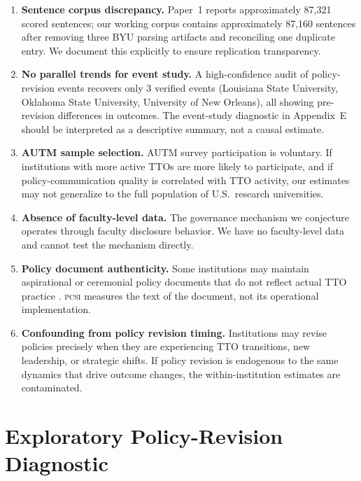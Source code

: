 \documentclass[12pt]{article}
\newcommand{\PCSI}{\textsc{pcsi}}
\begin{document}
\begin{enumerate}
\item \textbf{Sentence corpus discrepancy.} Paper~1 reports approximately 87,321
scored sentences; our working corpus contains approximately 87,160 sentences after
removing three BYU parsing artifacts and reconciling one duplicate entry. We
document this explicitly to ensure replication transparency.

\item \textbf{No parallel trends for event study.} A high-confidence audit of
policy-revision events recovers only 3 verified events (Louisiana State University,
Oklahoma State University, University of New Orleans), all showing pre-revision
differences in outcomes. The event-study diagnostic in Appendix~E should be
interpreted as a descriptive summary, not a causal estimate.

\item \textbf{AUTM sample selection.} AUTM survey participation is voluntary. If
institutions with more active TTOs are more likely to participate, and if
policy-communication quality is correlated with TTO activity, our estimates may
not generalize to the full population of U.S.\ research universities.

\item \textbf{Absence of faculty-level data.} The governance mechanism we conjecture
operates through faculty disclosure behavior. We have no faculty-level data and
cannot test the mechanism directly.

\item \textbf{Policy document authenticity.} Some institutions may maintain
aspirational or ceremonial policy documents that do not reflect actual TTO practice
\citep{dimaggio1983, meyer1977}. \PCSI{} measures the text of the document,
not its operational implementation.

\item \textbf{Confounding from policy revision timing.} Institutions may revise
policies precisely when they are experiencing TTO transitions, new leadership,
or strategic shifts. If policy revision is endogenous to the same dynamics that
drive outcome changes, the within-institution estimates are contaminated.

\end{enumerate}

\section{Exploratory Policy-Revision Diagnostic}
\label{sec:eventdiag}
\end{document}
